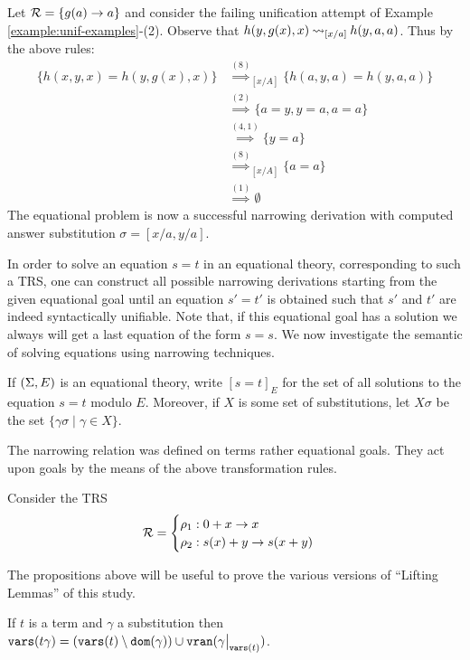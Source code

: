 \begin{example}
	Let $\mathcal{R} = \{ g(a) \rightarrow a \}$ and consider the failing unification attempt of Example \ref{example:unif-examples}-(2). Observe that $h(y,g(x),x) \mathbin{\rightsquigarrow}_{[x / a]} h(y,a,a)$. Thus by the above rules:
	\begin{align*}
		\{ h(x,y,x) = h(y,g(x),x) \} & \overset{(8)}{\implies}_{[x/A]} \{ h(a,y,a) = h(y,a,a) \} \\
		                             & \overset{(2)}{\implies} \{ a = y, y = a, a = a \}         \\
		                             & \overset{(4,1)}{\implies} \{ y = a\}                      \\
		                             & \overset{(8)}{\implies}_{[x/A]} \{  a = a \}              \\
		                             & \overset{(1)}{\implies} \emptyset
	\end{align*}
	The equational problem is now a successful narrowing derivation with computed answer substitution $\sigma = [x / a, y / a]$.
\end{example}

In order to solve an equation $s = t$ in an equational theory, corresponding to such a TRS, one can construct all possible narrowing derivations starting from the given equational goal until an equation $s' = t'$ is obtained such that $s'$ and $t'$ are indeed syntactically unifiable. Note that, if this equational goal has a solution we always will get a last equation of the form $s = s$. We now investigate the semantic of solving equations using narrowing techniques.

If $(\Sigma, E)$ is an equational theory, write $[s = t]_E$ for the set of all solutions to the equation $s = t$ modulo $E$. Moreover, if $X$ is some set of substitutions, let $X \sigma$ be the set $\{ \gamma \sigma \mid \gamma \in X \}$.

The narrowing relation was defined on terms rather equational goals. They act upon goals by the means of the above transformation rules.

\begin{example}
	Consider the TRS
	\[
		\mathcal{R} =
		\begin{cases}
			\rho_1: 0 + x \rightarrow x \\
			\rho_2: s(x) + y \rightarrow s(x + y)
		\end{cases}
	\]
\end{example}

The propositions above will be useful to prove the various versions of ``Lifting Lemmas'' of this study.
\begin{proposition}\label{proposition:varst}
	If $t$ is a term and $\gamma$ a substitution then $\vars{t\gamma} = (\vars{t} \setminus \dom{\gamma}) \cup \vran{\restr{\gamma}{\vars{t}}}$.
\end{proposition}


